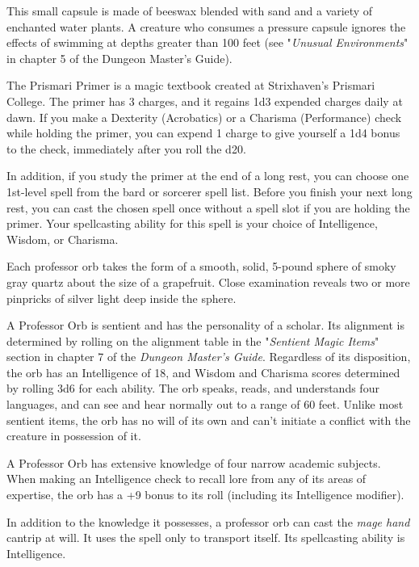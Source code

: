 \documentclass[10pt,a4paper,twoside,bg=print,twocolumn,openany,nodeprecatedcode]{dndbook}
\begin{document}
This small capsule is made of beeswax blended with sand and a variety of enchanted water plants. A creature who consumes a pressure capsule ignores the effects of swimming at depths greater than 100 feet (see "\textit{Unusual Environments}" in chapter 5 of the Dungeon Master's Guide).

The Prismari Primer is a magic textbook created at Strixhaven's Prismari College. The primer has 3 charges, and it regains 1d3 expended charges daily at dawn. If you make a Dexterity (Acrobatics) or a Charisma (Performance) check while holding the primer, you can expend 1 charge to give yourself a 1d4 bonus to the check, immediately after you roll the d20.

In addition, if you study the primer at the end of a long rest, you can choose one 1st-level spell from the bard or sorcerer spell list. Before you finish your next long rest, you can cast the chosen spell once without a spell slot if you are holding the primer. Your spellcasting ability for this spell is your choice of Intelligence, Wisdom, or Charisma.

Each professor orb takes the form of a smooth, solid, 5-pound sphere of smoky gray quartz about the size of a grapefruit. Close examination reveals two or more pinpricks of silver light deep inside the sphere.

A Professor Orb is sentient and has the personality of a scholar. Its alignment is determined by rolling on the alignment table in the "\textit{Sentient Magic Items}" section in chapter 7 of the \textit{Dungeon Master's Guide}. Regardless of its disposition, the orb has an Intelligence of 18, and Wisdom and Charisma scores determined by rolling 3d6 for each ability. The orb speaks, reads, and understands four languages, and can see and hear normally out to a range of 60 feet. Unlike most sentient items, the orb has no will of its own and can't initiate a conflict with the creature in possession of it.

A Professor Orb has extensive knowledge of four narrow academic subjects. When making an Intelligence check to recall lore from any of its areas of expertise, the orb has a +9 bonus to its roll (including its Intelligence modifier).

In addition to the knowledge it possesses, a professor orb can cast the \textit{mage hand} cantrip at will. It uses the spell only to transport itself. Its spellcasting ability is Intelligence.
\end{document}
